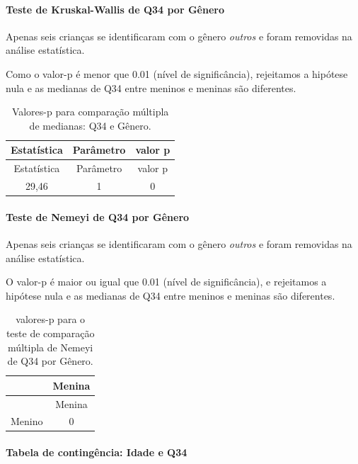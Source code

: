 \documentclass[]{article}
\let\oldparagraph\paragraph
\renewcommand{\paragraph}[1]{\oldparagraph{#1}\mbox{}}
\begin{document}
\hypertarget{teste-de-kruskal-wallis-de-q34-por-guxeanero}{%
\paragraph{Teste de Kruskal-Wallis de Q34 por Gênero}\label{teste-de-kruskal-wallis-de-q34-por-guxeanero}}

Apenas seis crianças se identificaram com o gênero \emph{outros} e foram removidas na análise estatística.

Como o valor-p é menor que 0.01 (nível de significância), rejeitamos a hipótese nula e as medianas de Q34 entre meninos e meninas são diferentes.

\begin{longtable}[]{@{}ccc@{}}
\caption{\label{tab:unnamed-chunk-1210}Valores-p para comparação múltipla de medianas: Q34 e Gênero.}\tabularnewline
\toprule
Estatística & Parâmetro & valor p\tabularnewline
\midrule
\endfirsthead
\toprule
Estatística & Parâmetro & valor p\tabularnewline
\midrule
\endhead
29,46 & 1 & 0\tabularnewline
\bottomrule
\end{longtable}

\hypertarget{teste-de-nemeyi-de-q34-por-guxeanero}{%
\paragraph{Teste de Nemeyi de Q34 por Gênero}\label{teste-de-nemeyi-de-q34-por-guxeanero}}

Apenas seis crianças se identificaram com o gênero \emph{outros} e foram removidas na análise estatística.

O valor-p é maior ou igual que 0.01 (nível de significância), e rejeitamos a hipótese nula e as medianas de Q34 entre meninos e meninas são diferentes.

\begin{longtable}[]{@{}lc@{}}
\caption{\label{tab:unnamed-chunk-1212}valores-p para o teste de comparação múltipla de Nemeyi de Q34 por Gênero.}\tabularnewline
\toprule
& Menina\tabularnewline
\midrule
\endfirsthead
\toprule
& Menina\tabularnewline
\midrule
\endhead
Menino & 0\tabularnewline
\bottomrule
\end{longtable}

\cleardoublepage

\hypertarget{tabela-de-continguxeancia-idade-e-q34}{%
\paragraph{Tabela de contingência: Idade e Q34}\label{tabela-de-continguxeancia-idade-e-q34}}
\end{document}
